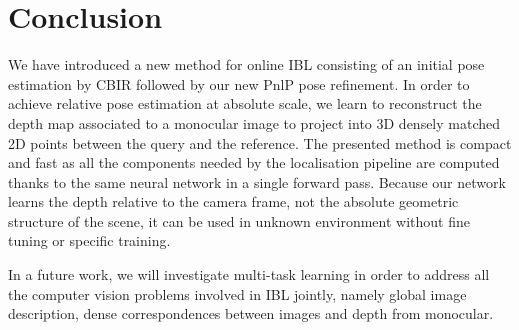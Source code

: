 \section{Conclusion}
\label{seq:conclusion}

We have introduced a new method for online IBL consisting of an initial pose estimation by CBIR followed by our new PnlP pose refinement. In order to achieve relative pose estimation at absolute scale, we learn to reconstruct the depth map associated to a monocular image to project into 3D densely matched 2D points between the query and the reference. The presented method is compact and fast as all the components needed by the localisation pipeline are computed thanks to the same neural network in a single forward pass. Because our network learns the depth relative to the camera frame, not the absolute geometric structure of the scene, it can be used in unknown environment without fine tuning or specific training. 

In a future work, we will investigate multi-task learning in order to address all the computer vision problems involved in IBL jointly, namely global image description, dense correspondences between images and depth from monocular.